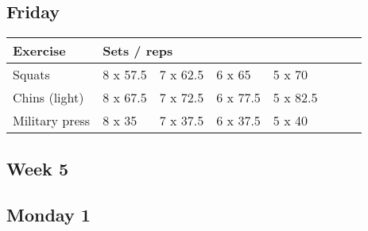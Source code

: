 \documentclass[12pt, a4paper]{article}%
\begin{document}
  \subsection*{\hspace{0.5em} Friday }


  \begin{tabular}{l|lllllll}
  \hspace{0.75em} \textbf{Exercise} & \multicolumn{ 7 }{l}{ \textbf{Sets / reps} } \\ \hline

            \hspace{0.75em} Squats
            & 8 x 57.5
            & 7 x 62.5
            & 6 x 65
            & 5 x 70
            & 
            & 
            & 
            \\


            \hspace{0.75em} Chins (light)
            & 8 x 67.5
            & 7 x 72.5
            & 6 x 77.5
            & 5 x 82.5
            & 
            & 
            & 
            \\


            \hspace{0.75em} Military press
            & 8 x 35
            & 7 x 37.5
            & 6 x 37.5
            & 5 x 40
            & 
            & 
            & 
            \\


  \end{tabular}


\clearpage \subsection*{\hspace{0.25em} Week 5 }
  \subsection*{\hspace{0.5em} Monday 1 }
\end{document}
